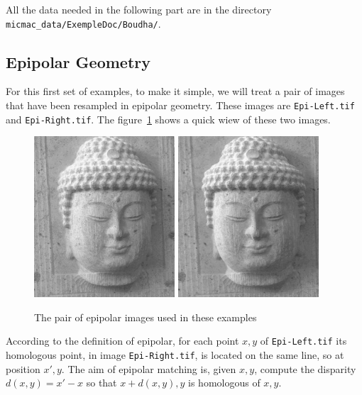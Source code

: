 All the data needed in the following part are in the directory 
{\tt micmac\_data/ExempleDoc/Boudha/}.


\subsection{Epipolar Geometry}

For this first set of examples, to make it simple, we will treat
a pair of images that have been resampled in epipolar geometry.
These images are {\tt Epi-Left.tif} and {\tt Epi-Right.tif}.
The figure~\ref{FIG:EPIP} shows a quick wiew of these two images.


\begin{figure}
\hspace{10 mm}
\includegraphics[height=60mm]{FIGS/Boudhas/Epi-Left.jpg}
\hspace{10 mm}
\includegraphics[height=60mm]{FIGS/Boudhas/Epi-Right.jpg}
\caption{The pair of epipolar images used in these examples}
\label{FIG:EPIP}
\end{figure}


According to the definition of epipolar, for each point $x,y$ of {\tt Epi-Left.tif} its
homologous point, in  image {\tt Epi-Right.tif}, is located on the same line, so at
position $x',y$.  The aim of epipolar matching is, given $x,y$,  compute the
disparity $d(x,y)=x'-x$ so that $x+d(x,y),y$ is homologous of  $x,y$.

